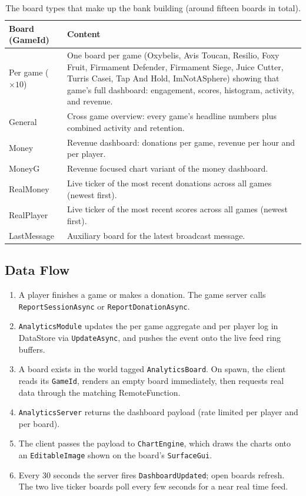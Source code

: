 \documentclass[12pt,letterpaper]{article}
\begin{document}
\begin{table}[H]
\centering
\footnotesize
\begin{tabular}{|p{3.5cm}|p{12cm}|}
\hline
\textbf{Board (GameId)} & \textbf{Content} \\
\hline
Per game ($\times 10$) & One board per game (Oxybelis, Avis Toucan, Resilio, Foxy Fruit, Firmament Defender, Firmament Siege, Juice Cutter, Turris Casei, Tap And Hold, ImNotASphere) showing that game's full dashboard: engagement, scores, histogram, activity, and revenue. \\
\hline
General & Cross game overview: every game's headline numbers plus combined activity and retention. \\
\hline
Money & Revenue dashboard: donations per game, revenue per hour and per player. \\
\hline
MoneyG & Revenue focused chart variant of the money dashboard. \\
\hline
RealMoney & Live ticker of the most recent donations across all games (newest first). \\
\hline
RealPlayer & Live ticker of the most recent scores across all games (newest first). \\
\hline
LastMessage & Auxiliary board for the latest broadcast message. \\
\hline
\end{tabular}
\caption{The board types that make up the bank building (around fifteen boards in total).}
\end{table}

\subsection{Data Flow}

\begin{enumerate}
  \item A player finishes a game or makes a donation. The game server calls \texttt{ReportSessionAsync} or \texttt{ReportDonationAsync}.
  \item \texttt{AnalyticsModule} updates the per game aggregate and per player log in DataStore via \texttt{UpdateAsync}, and pushes the event onto the live feed ring buffers.
  \item A board exists in the world tagged \texttt{AnalyticsBoard}. On spawn, the client reads its \texttt{GameId}, renders an empty board immediately, then requests real data through the matching RemoteFunction.
  \item \texttt{AnalyticsServer} returns the dashboard payload (rate limited per player and per board).
  \item The client passes the payload to \texttt{ChartEngine}, which draws the charts onto an \texttt{EditableImage} shown on the board's \texttt{SurfaceGui}.
  \item Every 30 seconds the server fires \texttt{DashboardUpdated}; open boards refresh. The two live ticker boards poll every few seconds for a near real time feed.
\end{enumerate}
\end{document}
